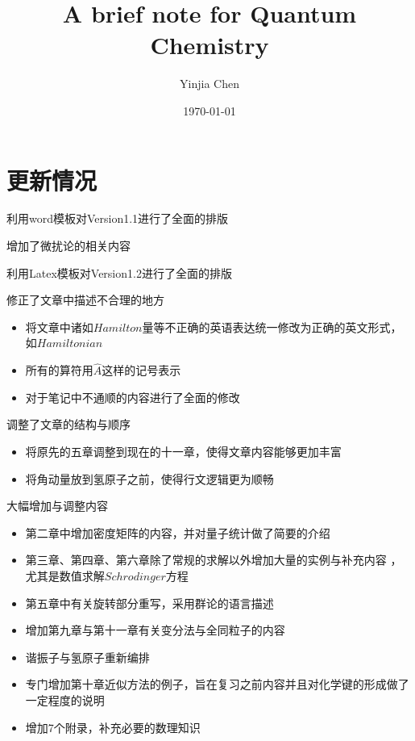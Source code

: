 \documentclass[cn,11pt,chinese,toc= twocol]{elegantbook}
\title{A brief note for Quantum Chemistry}
\author{Yinjia Chen}
\institute{华东理工大学}
\date{\today}
\begin{document}
\maketitle
\frontmatter
\chapter*{更新情况}

\begin{change}
  \item 利用word模板对Version1.1进行了全面的排版
  \item 增加了微扰论的相关内容
\end{change}

\begin{change}
    \item 利用Latex模板对Version1.2进行了全面的排版
    \item 修正了文章中描述不合理的地方
        \begin{itemize}
            \item 将文章中诸如$Hamilton$量等不正确的英语表达统一修改为正确的英文形式，如$Hamiltonian$
            \item 所有的算符用$\hat{A}$这样的记号表示
            \item 对于笔记中不通顺的内容进行了全面的修改
        \end{itemize}
    \item 调整了文章的结构与顺序
        \begin{itemize}
            \item 将原先的五章调整到现在的十一章，使得文章内容能够更加丰富
            \item 将角动量放到氢原子之前，使得行文逻辑更为顺畅
        \end{itemize}
    \item 大幅增加与调整内容
        \begin{itemize}
            \item 第二章中增加密度矩阵的内容，并对量子统计做了简要的介绍
            \item 第三章、第四章、第六章除了常规的求解以外增加大量的实例与补充内容         ，尤其是数值求解$Schrodinger$方程
            \item 第五章中有关旋转部分重写，采用群论的语言描述
            \item 增加第九章与第十一章有关变分法与全同粒子的内容
            \item 谐振子与氢原子重新编排
            \item 专门增加第十章近似方法的例子，旨在复习之前内容并且对化学键的形成做了一定程度的说明
            \item 增加7个附录，补充必要的数理知识
        \end{itemize}
  
\end{change}
\end{document}
